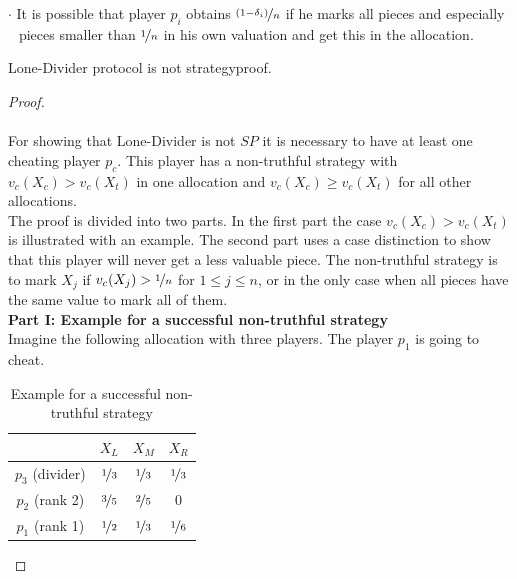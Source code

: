 $\cdot$ It is possible that player $p_i$ obtains $\nicefrac{(1-\delta_i)}{n}$ if he marks all pieces and especially\\\textcolor{white}{la}\textcolor{black}{}pieces smaller than $\nicefrac{1}{n}$ in his own valuation and get this in the allocation.
\pagebreak
\begin{lem}
\label{kd1}
Lone-Divider protocol is not strategyproof.
\end{lem}
\begin{proof} \textcolor{white}{x}\\\\
For showing that Lone-Divider is not $SP$ it is necessary to have at least one cheating player $p_c$. This player has a non-truthful strategy with $v_c(X_c)>v_c(X_t)$ in one allocation and $v_c(X_c) \geq v_c(X_t)$ for all other allocations.\\
The proof is divided into two parts. In the first part the case $v_c(X_c)>v_c(X_t)$ is illustrated with an example. The second part uses a case distinction to show that this player will never get a less valuable piece.
The non-truthful strategy is to mark $X_j$ if $v_c(X_j) > \nicefrac{1}{n}$ for $1 \leq j \leq n$, or in the only case when all pieces have the same value to mark all of them.\\
\newline
\textbf{Part I: Example for a successful non-truthful strategy}\\
\newline
Imagine the following allocation with three players. The player $p_1$ is going to cheat.
		\begin{table}[htb]
		\centering
		\renewcommand{\arraystretch}{1.2}
		\begin{tabular}{c|ccc}
		& $X_L$& $X_M$& $X_R$\\
		\hline
		$p_3$ (divider)  & $\nicefrac{1}{3}$ & {$\nicefrac{1}{3}$} & $\nicefrac{1}{3}$ \\
  $p_2$ (rank 2) & {$\nicefrac{3}{5}$} & $\nicefrac{2}{5}$ & $0$\\
  $p_1$ (rank 1)& {$\nicefrac{1}{2}$} & $\nicefrac{1}{3}$ & $\nicefrac{1}{6}$
 		\end{tabular}
 		
\caption{Example for a successful non-truthful strategy}\label{Table10}
\end{table}


\end{proof}
